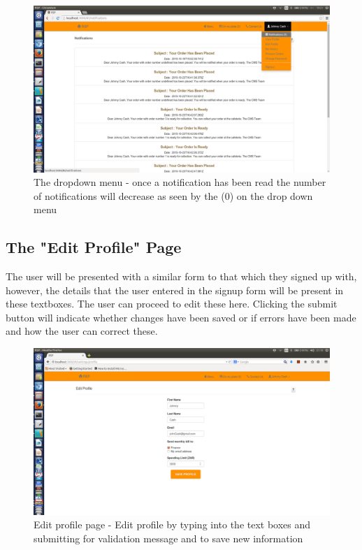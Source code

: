 \documentclass[a4paper,12pt]{report}
\begin{document}
\begin{figure}[H]
  \centering
    \includegraphics[width=1.0\textwidth]{screenshots/not3.png}
    \caption{The dropdown menu - once a notification has been read the number of notifications will decrease as seen by the (0) on the drop down menu } 
\end{figure}

\subsection{The "Edit Profile" Page} 
The user will be presented with a similar form to that which they signed up with, however, the details that the user entered in the signup form will be present in these textboxes. The user can proceed to edit these here. Clicking the submit button will indicate whether changes have been saved or if errors have been made and how the user can correct these.

\begin{figure}[H]
  \centering
    \includegraphics[width=1.0\textwidth]{screenshots/editProfile.png}
    \caption{Edit profile page - Edit profile by typing into the text boxes and submitting for validation message and to save new information } 
\end{figure}
\end{document}
